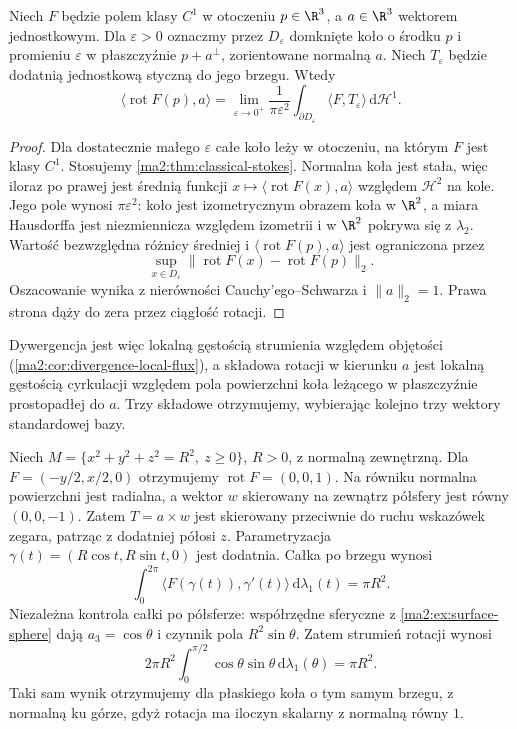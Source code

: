 \begin{wniosek}
\label{ma2:cor:curl-local-circulation}
Niech $F$ będzie polem klasy $C^1$ w otoczeniu
$p\in\R^3$, a $a\in\R^3$ wektorem jednostkowym.
Dla $\varepsilon>0$ oznaczmy przez $D_\varepsilon$
domknięte koło o środku $p$ i promieniu $\varepsilon$
w płaszczyźnie $p+a^\perp$, zorientowane normalną $a$.
Niech $T_\varepsilon$ będzie dodatnią jednostkową
styczną do jego brzegu. Wtedy
\[
 \langle\operatorname{rot}F(p),a\rangle
 =\lim_{\varepsilon\to0^+}
 \frac{1}{\pi\varepsilon^2}
 \int_{\partial D_\varepsilon}
 \langle F,T_\varepsilon\rangle\,
 \mathrm d\mathcal H^1.
\]
\end{wniosek}
\begin{proof}
Dla dostatecznie małego $\varepsilon$ całe koło
leży w otoczeniu, na którym $F$ jest klasy $C^1$.
Stosujemy \ref{ma2:thm:classical-stokes}.
Normalna koła jest stała, więc iloraz po prawej
jest średnią funkcji
$x\mapsto\langle\operatorname{rot}F(x),a\rangle$
względem $\mathcal H^2$ na kole.
Jego pole wynosi $\pi\varepsilon^2$:
koło jest izometrycznym obrazem koła w $\R^2$,
a miara Hausdorffa jest niezmiennicza względem
izometrii i w $\R^2$ pokrywa się z $\lambda_2$.
Wartość bezwzględna różnicy średniej i
$\langle\operatorname{rot}F(p),a\rangle$
jest ograniczona przez
\[
 \sup_{x\in D_\varepsilon}
 \|\operatorname{rot}F(x)-\operatorname{rot}F(p)\|_2.
\]
Oszacowanie wynika z nierówności
Cauchy'ego--Schwarza i $\|a\|_2=1$.
Prawa strona dąży do zera przez ciągłość rotacji.
\end{proof}

Dywergencja jest więc lokalną gęstością strumienia
względem objętości
(\ref{ma2:cor:divergence-local-flux}),
a składowa rotacji w kierunku $a$ jest lokalną
gęstością cyrkulacji względem pola powierzchni
koła leżącego w płaszczyźnie prostopadłej do $a$.
Trzy składowe otrzymujemy, wybierając
kolejno trzy wektory standardowej bazy.

\begin{przyklad}
\label{ma2:ex:stokes-hemisphere}
Niech $M=\{x^2+y^2+z^2=R^2,\ z\ge0\}$,
$R>0$, z normalną zewnętrzną.
Dla $F=(-y/2,x/2,0)$ otrzymujemy
$\operatorname{rot}F=(0,0,1)$.
Na równiku normalna powierzchni jest radialna,
a wektor $w$ skierowany na zewnątrz półsfery
jest równy $(0,0,-1)$.
Zatem $T=a\times w$ jest skierowany przeciwnie
do ruchu wskazówek zegara, patrząc z dodatniej
półosi $z$. Parametryzacja
$\gamma(t)=(R\cos t,R\sin t,0)$ jest dodatnia.
Całka po brzegu wynosi
\[
 \int_0^{2\pi}\langle F(\gamma(t)),\gamma'(t)\rangle
 \,\mathrm d\lambda_1(t)=\pi R^2.
\]
Niezależna kontrola całki po półsferze:
współrzędne sferyczne z
\ref{ma2:ex:surface-sphere} dają
$a_3=\cos\theta$ i czynnik pola $R^2\sin\theta$.
Zatem strumień rotacji wynosi
\[
 2\pi R^2\int_0^{\pi/2}\cos\theta\sin\theta\,
 \mathrm d\lambda_1(\theta)=\pi R^2.
\]
Taki sam wynik otrzymujemy dla płaskiego koła
o tym samym brzegu, z normalną ku górze,
gdyż rotacja ma iloczyn skalarny z normalną
równy $1$.
\end{przyklad}

